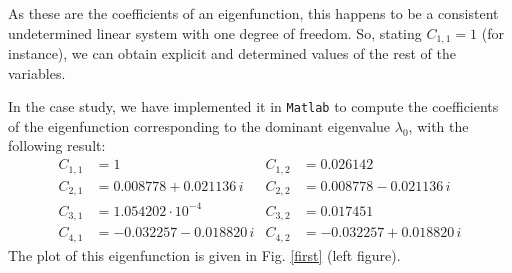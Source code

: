 \documentclass[a4paper]{article}
\newcommand{\X}[3]{#1_{#3,#2}}
\numberwithin{equation}{section}
\begin{document}
As these are the coefficients of an eigenfunction, this happens to be a consistent undetermined linear system with one degree of freedom. So, stating $\X{C}{1}{1} =1$ (for instance), we can obtain explicit and determined values of the rest of the variables.

In the case study, we have implemented it in \verb"Matlab" to compute the coefficients of the eigenfunction corresponding to the dominant eigenvalue $\lambda_0$, with the following result:
\begin{align*}%
\X{C}{1}{1} &= 1  & \X{C}{2}{1} &= 0.026142  \nonumber  \\
\X{C}{1}{2} &= 0.008778 + 0.021136\,i  & \X{C}{2}{2} &= 0.008778 - 0.021136\,i \nonumber  \\
\X{C}{1}{3} &= 1.054202\cdot 10^{-4}   & \X{C}{2}{3} &= 0.017451 \nonumber  \\
\X{C}{1}{4} &= -0.032257 - 0.018820\,i  & \X{C}{2}{4} &= -0.032257 + 0.018820\,i
\end{align*}
The plot of this eigenfunction is given in Fig. \ref{first} (left figure).
\end{document}
